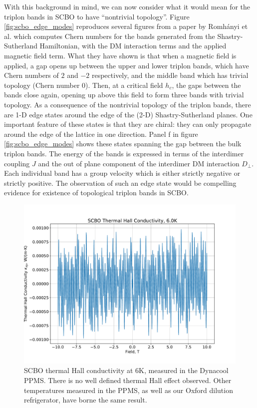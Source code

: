 \documentclass{thesis-umich}
\begin{document}
With this background in mind, we can now consider what it would mean for the triplon bands in SCBO to have ``nontrivial topology''. Figure \ref{fig:scbo_edge_modes} reproduces several figures from a paper by Romh\'{a}nyi et al. which computes Chern numbers for the bands generated from the Shastry-Sutherland Hamiltonian, with the DM interaction terms and the applied magnetic field term. What they have shown is that when a magnetic field is applied, a gap opens up between the upper and lower triplon bands, which have Chern numbers of $2$ and $-2$ respectively, and the middle band which has trivial topology (Chern number 0). Then, at a critical field $h_c$, the gaps between the bands close again, opening up above this field to form three bands with trivial topology. As a consequence of the nontrivial topology of the triplon bands, there are 1-D edge states around the edge of the (2-D) Shastry-Sutherland planes. One important feature of these states is that they are chiral: they can only propagate around the edge of the lattice in one direction. Panel f in figure \ref{fig:scbo_edge_modes} shows these states spanning the gap between the bulk triplon bands. The energy of the bands is expressed in terms of the interdimer coupling $J$ and the out of plane component of the interdimer DM interaction $D_\perp$. Each individual band has a group velocity which is either strictly negative or strictly positive. The observation of such an edge state would be compelling evidence for existence of topological triplon bands in SCBO.

\begin{figure}
	\centering
	\caption[SCBO Thermal Hall: Negative Result]{SCBO thermal Hall conductivity at 6K, measured in the Dynacool PPMS. There is no well defined thermal Hall effect observed. Other temperatures measured in the PPMS, as well as our Oxford dilution refrigerator, have borne the same result.}
	\label{fig:scbo_thall_neg}
	\includegraphics[width=\columnwidth]{figures/SCBO_Thermal_Hall_Negative.pdf}
\end{figure}
\end{document}
